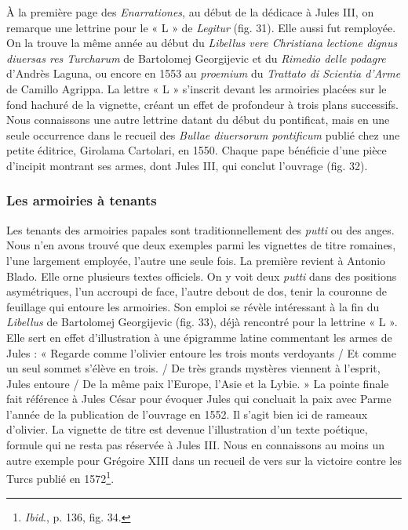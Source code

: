 \documentclass[12pt,twoside,openany]{book}
\begin{document}
À la première page des \textit{Enarrationes}, au début de la dédicace à Jules III, on remarque une lettrine pour le « L » de \textit{Legitur} (fig. 31). Elle aussi fut remployée. On la trouve la même année au début du \textit{Libellus vere Christiana lectione dignus diuersas res Turcharum} de Bartolomej Georgijevic et du \textit{Rimedio delle podagre} d’Andrès Laguna, ou encore en 1553 au \textit{proemium} du \textit{Trattato di Scientia d’Arme} de Camillo Agrippa. La lettre « L » s’inscrit devant les armoiries placées sur le fond hachuré de la vignette, créant un effet de profondeur à trois plans successifs. Nous connaissons une autre lettrine datant du début du pontificat, mais en une seule occurrence dans le recueil des \textit{Bullae diuersorum pontificum} publié chez une petite éditrice, Girolama Cartolari, en 1550. Chaque pape bénéficie d’une pièce d’incipit montrant ses armes, dont Jules III, qui conclut l’ouvrage (fig. 32).

\subsubsection{Les armoiries à tenants}

Les tenants des armoiries papales sont traditionnellement des \textit{putti} ou des anges. Nous n’en avons trouvé que deux exemples parmi les vignettes de titre romaines, l’une largement employée, l’autre une seule fois. La première revient à Antonio Blado. Elle orne plusieurs textes officiels. On y voit deux \textit{putti} dans des positions asymétriques, l’un accroupi de face, l’autre debout de dos, tenir la couronne de feuillage qui entoure les armoiries. Son emploi se révèle intéressant à la fin du \textit{Libellus} de Bartolomej Georgijevic (fig. 33), déjà rencontré pour la lettrine « L ». Elle sert en effet d’illustration à une épigramme latine commentant les armes de Jules : « Regarde comme l’olivier entoure les trois monts verdoyants / Et comme un seul sommet s’élève en trois. / De très grands mystères viennent à l’esprit, Jules entoure / De la même paix l’Europe, l’Asie et la Lybie. » La pointe finale fait référence à Jules César pour évoquer Jules qui concluait la paix avec Parme l’année de la publication de l’ouvrage en 1552. Il s’agit bien ici de rameaux d’olivier. La vignette de titre est devenue l’illustration d’un texte poétique, formule qui ne resta pas réservée à Jules III. Nous en connaissons au moins un autre exemple pour Grégoire XIII dans un recueil de vers sur la victoire contre les Turcs publié en 1572\footnote{\textit{Ibid}., p. 136, fig. 34.}.
\end{document}

